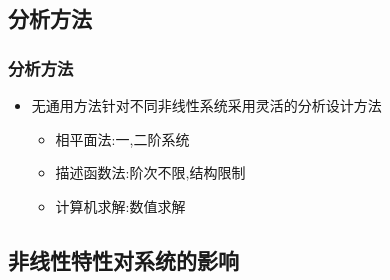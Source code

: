 \documentclass[table]{article}
\begin{document}
\subsection{分析方法}
\label{sec-1-2}
\begin{frame}
\frametitle{分析方法}
\label{sec-1-2-1}

\begin{itemize}
\item <2->无通用方法针对不同非线性系统采用灵活的分析设计方法
\begin{itemize}
\item <3->相平面法:一,二阶系统
\item <4->描述函数法:阶次不限,结构限制
\item <5->计算机求解:数值求解
\end{itemize}
\end{itemize}
\end{frame}
\subsection{非线性特性对系统的影响}
\label{sec-1-3}
\end{document}
